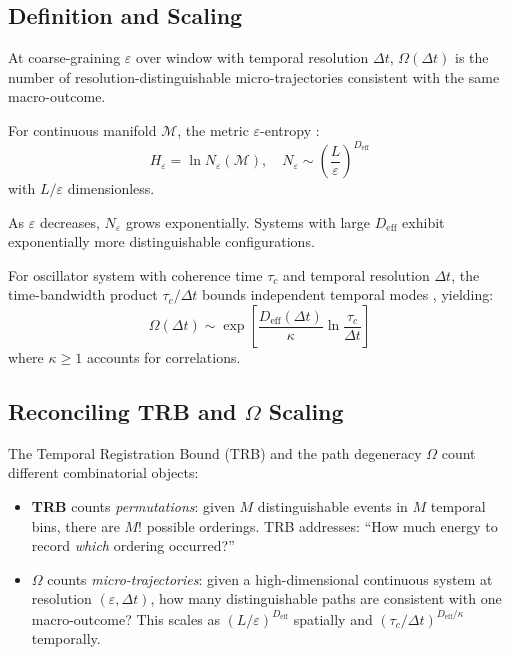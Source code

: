 \documentclass[12pt]{article}
\numberwithin{equation}{section}
\begin{document}
\subsection{Definition and Scaling}

At coarse-graining $\varepsilon$ over window with temporal resolution $\Delta t$, $\Omega(\Delta t)$ is the number of resolution-distinguishable micro-trajectories consistent with the same macro-outcome.

For continuous manifold $\mathcal{M}$, the metric $\varepsilon$-entropy \cite{kolmogorov1959}:
\begin{equation}
H_\varepsilon = \ln N_\varepsilon(\mathcal{M}), \quad N_\varepsilon \sim \left(\frac{L}{\varepsilon}\right)^{D_{\text{eff}}}
\end{equation}
with $L/\varepsilon$ dimensionless.

As $\varepsilon$ decreases, $N_\varepsilon$ grows exponentially. Systems with large $D_{\text{eff}}$ exhibit exponentially more distinguishable configurations.

For oscillator system with coherence time $\tau_c$ and temporal resolution $\Delta t$, the time-bandwidth product $\tau_c/\Delta t$ bounds independent temporal modes \cite{slepian1961}, yielding:
\begin{equation}
\Omega(\Delta t) \sim \exp\left[\frac{D_{\text{eff}}(\Delta t)}{\kappa} \ln\frac{\tau_c}{\Delta t}\right]
\end{equation}
where $\kappa \geq 1$ accounts for correlations.

\subsection{Reconciling TRB and $\Omega$ Scaling}

The Temporal Registration Bound (TRB) and the path degeneracy $\Omega$ count different combinatorial objects:

\begin{itemize}
\item \textbf{TRB} counts \emph{permutations}: given $M$ distinguishable events in $M$ temporal bins, there are $M!$ possible orderings. TRB addresses: ``How much energy to record \emph{which} ordering occurred?''

\item \textbf{$\Omega$} counts \emph{micro-trajectories}: given a high-dimensional continuous system at resolution $(\varepsilon, \Delta t)$, how many distinguishable paths are consistent with one macro-outcome? This scales as $(L/\varepsilon)^{D_{\mathrm{eff}}}$ spatially and $(\tau_c/\Delta t)^{D_{\mathrm{eff}}/\kappa}$ temporally.
\end{itemize}
\end{document}
